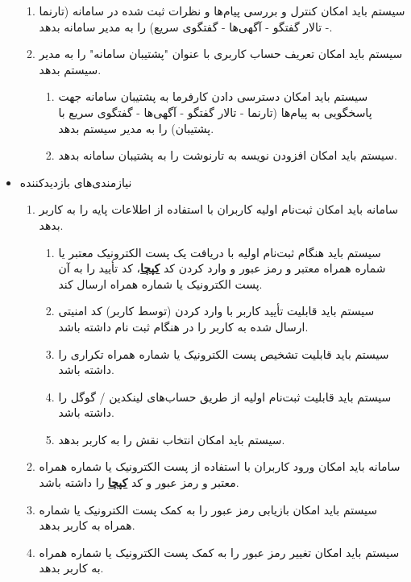 \documentclass[12pt]{article}
\begin{document}
\begin{itemize}
\begin{enumerate}
			\item سیستم باید امکان کنترل و بررسی پیام‌ها و نظرات ثبت شده در سامانه (تارنما - تالار گفتگو - آگهی‌ها - گفتگوی سریع) را به مدیر سامانه بدهد.
			\item سیستم باید امکان تعریف حساب کاربری با عنوان "پشتیبان سامانه" را به مدیر سیستم بدهد.
			\begin{enumerate}
				\renewcommand{\labelenumii}{-R\arabic{enumi}.\arabic{enumii}}
				\item سیستم باید امکان دسترسی دادن کارفرما به پشتیبان سامانه جهت پاسخگویی به پیام‌ها (تارنما - تالار گفتگو - آگهی‌ها - گفتگوی سریع با پشتیبان) را به مدیر سیستم بدهد.
				\item سیستم باید امکان افزودن نویسه به تارنوشت را به پشتیبان سامانه بدهد.
			\end{enumerate}
		\end{enumerate}
		\item
		نیازمندی‌های بازدید‌کننده
		\begin{enumerate}
			\renewcommand{\labelenumi}{-R\arabic{enumi}}
			\setcounter{enumi}{14}
			\item سامانه باید امکان ثبت‌نام اولیه کاربران با استفاده از اطلاعات پایه را به کاربر بدهد.
			\begin{enumerate}
				\renewcommand{\labelenumii}{-R\arabic{enumi}.\arabic{enumii}}
				\item سیستم باید هنگام ثبت‌نام اولیه با دریافت یک‌ پست الکترونیک معتبر یا شماره همراه معتبر و رمز عبور و وارد کردن کد \textbf{\hyperref[ref:captcha]{کپچا}}، کد تأیید را به آن پست الکترونیک یا شماره همراه ارسال کند.
				\item سیستم باید قابلیت تأیید کاربر با وارد کردن (توسط کاربر) کد امنیتی ارسال شده به کاربر را در هنگام ثبت نام داشته باشد.
				\item سیستم باید قابلیت تشخیص پست الکترونیک یا شماره همراه تکراری را داشته باشد.
				\item سیستم باید قابلیت ثبت‌نام اولیه از طریق حساب‌های لینکدین / گوگل را داشته باشد.
				\item سیستم باید امکان انتخاب نقش را به کاربر بدهد.
			\end{enumerate}
			\item سامانه باید امکان ورود کاربران با استفاده از پست الکترونیک یا شماره همراه معتبر و رمز عبور و کد \textbf{\hyperref[ref:captcha]{کپچا}} را داشته باشد.
			\item سیستم باید امکان بازیابی رمز عبور را به کمک پست الکترونیک یا شماره همراه به کاربر بدهد.
			\item سیستم باید امکان تغییر رمز عبور را به کمک پست الکترونیک یا شماره همراه به کاربر بدهد.

\end{enumerate}
\end{itemize}
\end{document}

